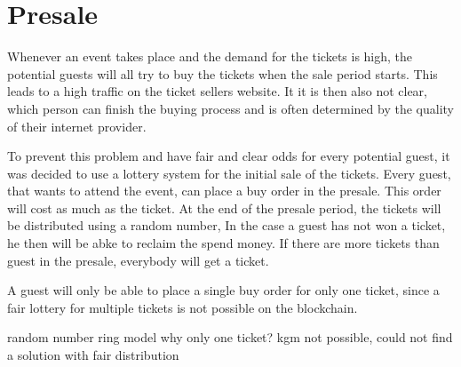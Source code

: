 \section{Presale}\label{section:des:presale}
Whenever an event takes place and the demand for the tickets is high, the potential guests will all try to buy the tickets when the sale period starts. This leads to a high traffic on the ticket sellers website. It it is then also not clear, which person can finish the buying process and is often determined by the quality of their internet provider.

To prevent this problem and have fair and clear odds for every potential guest, it was decided to use a lottery system for the initial sale of the tickets. Every guest, that wants to attend the event, can place a buy order in the presale. This order will cost as much as the ticket. At the end of the presale period, the tickets will be distributed using a random number, In the case a guest has not won a ticket, he then will be abke to reclaim the spend money. If there are more tickets than guest in the presale, everybody will get a ticket. 

 A guest will only be able to place a single buy order for only one ticket, since a fair lottery for multiple tickets is not possible on the blockchain. 

random number
ring model
why only one ticket? kgm not possible, could not find a solution with fair distribution

